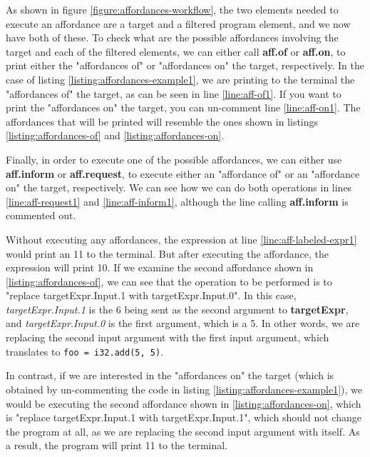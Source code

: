 \documentclass[11pt,fleqn,openany]{book} %
\begin{document}
As shown in figure \ref{figure:affordances-workflow}, the two elements needed to execute an affordance are a target and a filtered program element, and we now have both of these. To check what are the possible affordances involving the target and each of the filtered elements, we can either call \textbf{aff.of} or \textbf{aff.on}, to print either the "affordances of" or "affordances on" the target, respectively. In the case of listing \ref{listing:affordances-example1}, we are printing to the terminal the "affordances of" the target, as can be seen in line \ref{line:aff-of1}. If you want to print the "affordances on" the target, you can un-comment line \ref{line:aff-on1}. The affordances that will be printed will resemble the ones shown in listings \ref{listing:affordances-of} and \ref{listing:affordances-on}.

Finally, in order to execute one of the possible affordances, we can either use \textbf{aff.inform} or \textbf{aff.request}, to execute either an "affordance of" or an "affordance on" the target, respectively. We can see how we can do both operations in lines \ref{line:aff-request1} and \ref{line:aff-inform1}, although the line calling \textbf{aff.inform} is commented out.

Without executing any affordances, the expression at line \ref{line:aff-labeled-expr1} would print an 11 to the terminal. But after executing the affordance, the expression will print 10. If we examine the second affordance shown in \ref{listing:affordances-of}, we can see that the operation to be performed is to "replace targetExpr.Input.1 with targetExpr.Input.0". In this case, \emph{targetExpr.Input.1} is the 6 being sent as the second argument to \textbf{targetExpr}, and \emph{targetExpr.Input.0} is the first argument, which is a 5. In other words, we are replacing the second input argument with the first input argument, which translates to \lstinline{foo = i32.add(5, 5)}.

In contrast, if we are interested in the "affordances on" the target (which is obtained by un-commenting the code in listing \ref{listing:affordances-example1}), we would be executing the second affordance shown in \ref{listing:affordances-on}, which is "replace targetExpr.Input.1 with targetExpr.Input.1", which should not change the program at all, as we are replacing the second input argument with itself. As a result, the program will print 11 to the terminal.
\end{document}
